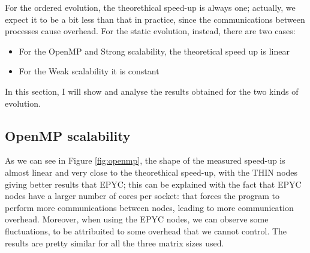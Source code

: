 \documentclass[12pt]{article}
\begin{document}
	For the ordered evolution, the theorethical speed-up is always one; actually, we expect it to be a bit less than that in practice, since the communications between processes cause overhead. For the static evolution, instead, there are two cases:
	\begin{itemize}
		\item For the OpenMP and Strong scalability, the theoretical speed up is linear
		\item For the Weak scalability it is constant
	\end{itemize}
	
	In this section, I will show and analyse the results obtained for the two kinds of evolution.
	
    \subsection{OpenMP scalability}
    As we can see in Figure \ref{fig:openmp}, the shape of the measured speed-up is almost linear and very close to the theorethical speed-up, with the THIN nodes giving better results that EPYC; this can be explained with the fact that EPYC nodes have a  larger number of cores per socket: that forces the program to perform more communications between nodes, leading to more communication overhead. Moreover, when using the EPYC nodes, we can observe some fluctuations, to be attribuited to some overhead that we cannot control. The results are pretty similar for all the three matrix sizes used.
\end{document}
